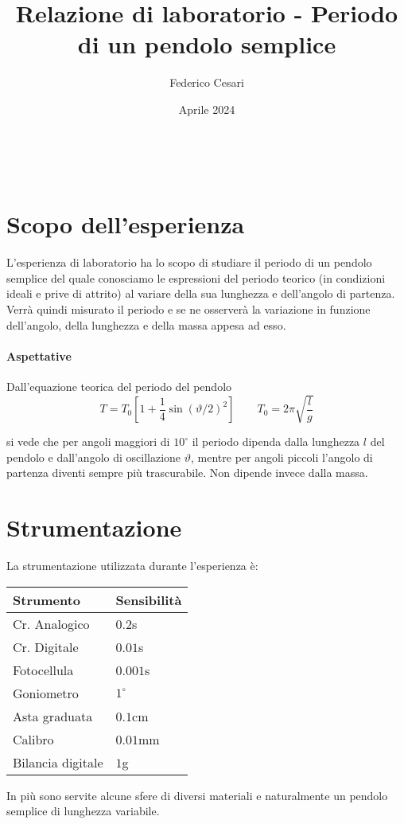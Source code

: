 \documentclass{article}
\title{Relazione di laboratorio - Periodo di un pendolo semplice}
\author{Federico Cesari}
\date{Aprile 2024}
\begin{document}
	
	\tableofcontents
	
	\newpage
	\textcolor{white}{.}
	\vfill
	\section{Scopo dell’esperienza}
	L'esperienza di laboratorio ha lo scopo di studiare il periodo di un pendolo semplice del quale conosciamo le espressioni del periodo teorico (in condizioni ideali e prive di attrito) al variare della sua lunghezza e dell'angolo di partenza. Verrà quindi misurato il periodo e se ne osserverà la variazione in funzione dell'angolo, della lunghezza e della massa appesa ad esso.
	
	\paragraph{Aspettative} Dall'equazione teorica del periodo del pendolo 
	\begin{equation} \label{eq:1}
		T = T_0\left[1 + \frac{1}{4}\sin{(\vartheta/2)^2}\right] \qquad  T_0 = 2\pi \sqrt{\frac{l}{g}} 
	\end{equation}
	
	si vede che per angoli maggiori di $10^\circ$ il periodo dipenda dalla lunghezza $l$ del pendolo e dall'angolo di oscillazione $\vartheta$, mentre per angoli piccoli l'angolo di partenza diventi sempre più trascurabile. Non dipende invece dalla massa.
	
	\section{Strumentazione}
	La strumentazione utilizzata durante l'esperienza è:
	
	\begin{table}[H]
		\centering
		\begin{tabular}{@{}ll@{}}
			\textbf{Strumento} & \textbf{Sensibilità} \\ \midrule
			Cr. Analogico      & $0.2$s               \\
			Cr. Digitale       & $0.01$s              \\
			Fotocellula        & $0.001$s             \\
			Goniometro         & $1^\circ$            \\
			Asta graduata      & $0.1$cm              \\
			Calibro            & $0.01$mm             \\
			Bilancia digitale  & $1$g                 \\ \bottomrule
		\end{tabular}
	\end{table}
	\noindent
	In più sono servite alcune sfere di diversi materiali e naturalmente un pendolo semplice di lunghezza variabile.
	
\end{document}
